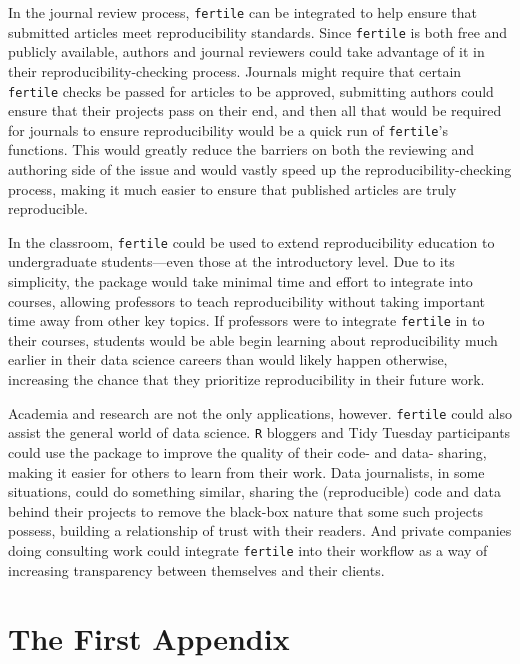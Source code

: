 \documentclass[12pt,twoside]{reedthesis}
\begin{document}
In the journal review process, \texttt{fertile} can be integrated to help ensure that submitted articles meet reproducibility standards. Since \texttt{fertile} is both free and publicly available, authors and journal reviewers could take advantage of it in their reproducibility-checking process. Journals might require that certain \texttt{fertile} checks be passed for articles to be approved, submitting authors could ensure that their projects pass on their end, and then all that would be required for journals to ensure reproducibility would be a quick run of \texttt{fertile}'s functions. This would greatly reduce the barriers on both the reviewing and authoring side of the issue and would vastly speed up the reproducibility-checking process, making it much easier to ensure that published articles are truly reproducible.

In the classroom, \texttt{fertile} could be used to extend reproducibility education to undergraduate students---even those at the introductory level. Due to its simplicity, the package would take minimal time and effort to integrate into courses, allowing professors to teach reproducibility without taking important time away from other key topics. If professors were to integrate \texttt{fertile} in to their courses, students would be able begin learning about reproducibility much earlier in their data science careers than would likely happen otherwise, increasing the chance that they prioritize reproducibility in their future work.

Academia and research are not the only applications, however. \texttt{fertile} could also assist the general world of data science. \texttt{R} bloggers and Tidy Tuesday participants could use the package to improve the quality of their code- and data- sharing, making it easier for others to learn from their work. Data journalists, in some situations, could do something similar, sharing the (reproducible) code and data behind their projects to remove the black-box nature that some such projects possess, building a relationship of trust with their readers. And private companies doing consulting work could integrate \texttt{fertile} into their workflow as a way of increasing transparency between themselves and their clients.

\appendix

\hypertarget{the-first-appendix}{%
\chapter{The First Appendix}\label{the-first-appendix}}
\end{document}
